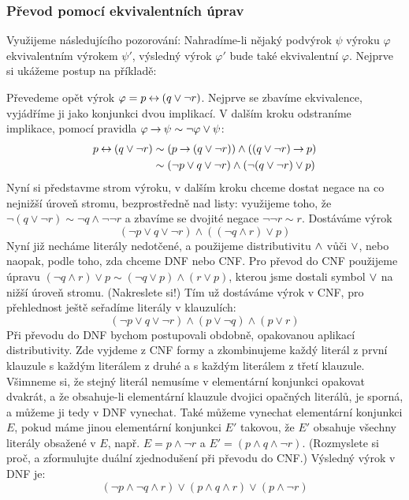 \subsubsection{Převod pomocí ekvivalentních úprav}

Využijeme následujícího pozorování: Nahradíme-li nějaký podvýrok $\psi$ výroku $\varphi$ ekvivalentním výrokem $\psi'$, výsledný výrok $\varphi'$ bude také ekvivalentní $\varphi$. Nejprve si ukážeme postup na příkladě:

\begin{example}
    Převedeme opět výrok $\varphi=p\mathbin{\leftrightarrow} (q\lor \neg r)$. Nejprve se zbavíme ekvivalence, vyjádříme ji jako konjunkci dvou implikací. V dalším kroku odstraníme implikace, pomocí pravidla $\varphi\mathbin{\rightarrow}\psi\sim\neg\varphi\lor\psi$:
    \begin{align*}
        p\mathbin{\leftrightarrow} (q\lor \neg r) &\sim (p\mathbin{\rightarrow} (q\lor \neg r)) \land ((q\lor \neg r) \mathbin{\rightarrow} p)\\
        &\sim (\neg p\lor q\lor \neg r) \land (\neg (q\lor \neg r) \lor p)
    \end{align*}
    Nyní si představme strom výroku, v dalším kroku chceme dostat negace na co nejnižší úroveň stromu, bezprostředně nad listy: využijeme toho, že $\neg (q\lor \neg r)\sim \neg q\land \neg\neg r$ a zbavíme se dvojité negace $\neg\neg r\sim r$. Dostáváme výrok 
    $$
    (\neg p\lor q\lor \neg r) \land ( (\neg q\land r) \lor p)
    $$
    Nyní již necháme literály nedotčené, a použijeme distributivitu ${\land}$ vůči ${\lor}$, nebo naopak, podle toho, zda chceme DNF nebo CNF. Pro převod do CNF použijeme úpravu $(\neg q\land r) \lor p\sim (\neg q\lor p)\land (r \lor p) $, kterou jsme dostali symbol ${\lor}$ na nižší úroveň stromu. (Nakreslete si!) Tím už dostáváme výrok v CNF, pro přehlednost ještě seřadíme literály v klauzulích:
    $$
    (\neg p\lor q\lor \neg r) \land (p\lor \neg q) \land (p \lor r) 
    $$
    Při převodu do DNF bychom postupovali obdobně, opakovanou aplikací distributivity. Zde vyjdeme z CNF formy a zkombinujeme každý literál z první klauzule s každým literálem z druhé a s každým literálem z třetí klauzule. Všimneme si, že stejný literál nemusíme v elementární konjunkci opakovat dvakrát, a že obsahuje-li elementární klauzule dvojici opačných literálů, je sporná, a můžeme ji tedy v DNF vynechat. Také můžeme vynechat elementární konjunkci $E$, pokud máme jinou elementární konjunkci $E'$ takovou, že $E'$ obsahuje všechny literály obsažené v $E$, např. $E=p\land \neg r$ a $E'=(p\land q \land \neg r)$. (Rozmyslete si proč, a zformulujte duální zjednodušení při převodu do CNF.) Výsledný výrok v DNF je:
    $$
    (\neg p \land \neg q\land r) \lor (p\land q \land r) \lor (p\land \neg r)
    $$
\end{example}

